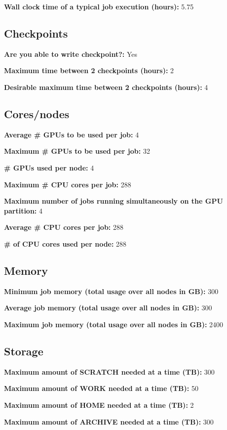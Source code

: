 \documentclass[12pt,a4paper]{article}
\begin{document}
\textbf{Wall clock time of a typical job execution (hours):} 5.75

\subsection*{Checkpoints}

\textbf{Are you able to write checkpoint?:} Yes

\textbf{Maximum time between 2 checkpoints (hours):} 2

\textbf{Desirable maximum time between 2 checkpoints (hours):} 4

\subsection*{Cores/nodes}

\textbf{Average \# GPUs to be used per job:} 4

\textbf{Maximum \# GPUs to be used per job:} 32

\textbf{\# GPUs used per node:} 4

\textbf{Maximum \# CPU cores per job:} 288

\textbf{Maximum number of jobs running simultaneously on the GPU partition:} 4

\textbf{Average \# CPU cores per job:} 288

\textbf{\# of CPU cores used per node:} 288

\subsection*{Memory}

\textbf{Minimum job memory (total usage over all nodes in GB):} 300

\textbf{Average job memory (total usage over all nodes in GB):} 300

\textbf{Maximum job memory (total usage over all nodes in GB):} 2400

\subsection*{Storage}

\textbf{Maximum amount of SCRATCH needed at a time (TB):} 300

\textbf{Maximum amount of WORK needed at a time (TB):} 50

\textbf{Maximum amount of HOME needed at a time (TB):} 2

\textbf{Maximum amount of ARCHIVE needed at a time (TB):} 300
\end{document}

